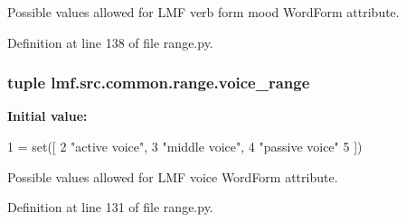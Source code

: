 Possible values allowed for L\+M\+F verb form mood Word\+Form attribute. 



Definition at line 138 of file range.\+py.

\hypertarget{namespacelmf_1_1src_1_1common_1_1range_a23fdc4c034bc34cab81c6b9c051074dd}{
\subsubsection[{voice\+\_\+range}]{\setlength{\rightskip}{0pt plus 5cm}tuple lmf.\+src.\+common.\+range.\+voice\+\_\+range}}\label{namespacelmf_1_1src_1_1common_1_1range_a23fdc4c034bc34cab81c6b9c051074dd}
{\bfseries Initial value\+:}
\begin{DoxyCode}
1 = set([
2     \textcolor{stringliteral}{"active voice"},
3     \textcolor{stringliteral}{"middle voice"},
4     \textcolor{stringliteral}{"passive voice"}
5 ])
\end{DoxyCode}


Possible values allowed for L\+M\+F voice Word\+Form attribute. 



Definition at line 131 of file range.\+py.

